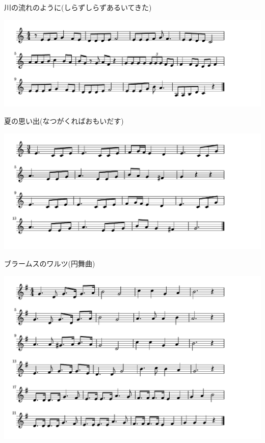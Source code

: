 \documentclass[a4paper]{ltjsarticle}
\begin{document}
\vspace{-10mm} \hspace{10mm}
川の流れのように(しらずしらずあるいてきた)

\includegraphics[clip]{natsunoomoide_crop.pdf}

\vspace{-10mm} \hspace{10mm}
夏の思い出(なつがくればおもいだす)

\includegraphics[clip]{waltzbrahms_crop.pdf}

\vspace{-10mm} \hspace{10mm}
ブラームスのワルツ(円舞曲)

\includegraphics[clip]{senrowa_crop.pdf}
\end{document}
